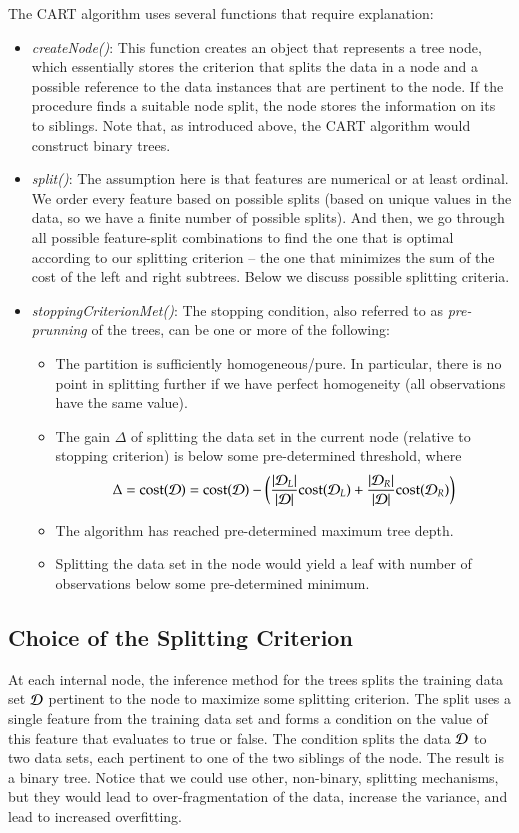 \begin{refsection}
The CART algorithm uses several functions that require explanation:
\begin{itemize}
\item {\em createNode()}: This function creates an object that represents a tree node, which essentially stores the criterion that splits the data in a node and a possible reference to the data instances that are pertinent to the node. If the procedure finds a suitable node split, the node stores the information on its to siblings. Note that, as introduced above, the CART algorithm would construct binary trees.
\item {\em split()}: The assumption here is that features are numerical or at least ordinal. We order every feature based on possible splits (based on unique values in the data, so we have a finite number of possible splits). And then, we go through all possible feature-split combinations to find the one that is optimal according to our splitting criterion -- the one that minimizes the sum of the cost of the left and right subtrees. Below we discuss possible splitting criteria.

\item {\em stoppingCriterionMet()}: The stopping condition, also referred to as {\em pre-prunning} of the trees, can be one or more of the following:
\begin{itemize}
\item The partition is sufficiently homogeneous/pure. In particular, there is no point in splitting further if we have perfect homogeneity (all observations have the same value).
\item The gain $\Delta$ of splitting the data set in the current node (relative to stopping criterion) is below some pre-determined threshold, where
$$ \Delta = {\rm cost}(\mathcal{D}) = {\rm cost}(\mathcal{D})-\left({|\mathcal{D}_L|\over |\mathcal{D}|}{\rm cost}(\mathcal{D}_L) + {|\mathcal{D}_R|\over |\mathcal{D}|}{\rm cost}(\mathcal{D}_R)\right)$$
\item The algorithm has reached pre-determined maximum tree depth.
\item Splitting the data set in the node would yield a leaf with number of observations below some pre-determined minimum.
\end{itemize}
\end{itemize}


\subsection*{Choice of the Splitting Criterion}

At each internal node, the inference method for the trees splits the training data set $\mathcal{D}$ pertinent to the node to maximize some splitting criterion. The split uses a single feature from the training data set and forms a condition on the value of this feature that evaluates to true or false. The condition splits the data $\mathcal{D}$ to two data sets, each pertinent to one of the two siblings of the node. The result is a binary tree. Notice that we could use other, non-binary, splitting mechanisms, but they would lead to over-fragmentation of the data, increase the variance, and lead to increased overfitting.


\end{refsection}
